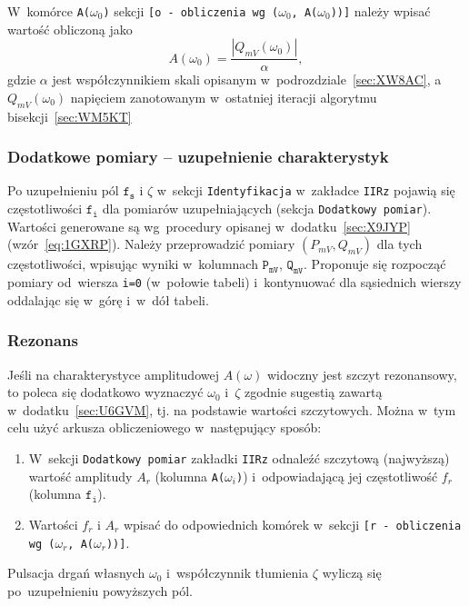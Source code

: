 \documentclass[paper=a4,DIV=12]{lpas}
\begin{document}
W~komórce \texttt{A($\omega_0$)} sekcji \texttt{[o - obliczenia wg ($\omega_0$,
A($\omega_0$))]} należy wpisać wartość obliczoną jako
\begin{equation}
  A(\omega_0) = \frac{|Q_{mV}(\omega_0)|}{\alpha},
  \label{eq:A7ZD6}
\end{equation}
gdzie $\alpha$ jest współczynnikiem skali opisanym
w~podrozdziale~\ref{sec:XW8AC}, a~$Q_{mV}(\omega_0)$ napięciem zanotowanym
w~ostatniej iteracji algorytmu bisekcji~\ref{sec:WM5KT}


\subsubsection{Dodatkowe pomiary -- uzupełnienie charakterystyk}
\label{sec:09H54}

Po uzupełnieniu pól $\texttt{f}_\texttt{s}$ i $\zeta$ w~sekcji
\texttt{Identyfikacja} w~zakładce \texttt{IIRz} pojawią się częstotliwości
$\texttt{f}_\texttt{i}$ dla pomiarów uzupełniających (sekcja \texttt{Dodatkowy
pomiar}). Wartości generowane są wg~procedury opisanej w~dodatku~\ref{sec:X9JYP}
(wzór~\eqref{eq:1GXRP}). Należy przeprowadzić pomiary $(P_{mV}, Q_{mV})$ dla
tych częstotliwości, wpisując wyniki w~kolumnach $\texttt{P}_\texttt{mV}$,
$\texttt{Q}_\texttt{mV}$. Proponuje się rozpocząć pomiary od~wiersza
\texttt{i=0} (w~połowie tabeli) i~kontynuować dla sąsiednich wierszy oddalając
się w~górę i~w~dół tabeli.

\subsubsection{Rezonans}
\label{sec:0NZQS}

Jeśli na charakterystyce amplitudowej $A(\omega)$ widoczny jest szczyt
rezonansowy, to poleca się dodatkowo wyznaczyć $\omega_0$ i~$\zeta$ zgodnie
sugestią zawartą w~dodatku~\ref{sec:U6GVM}, tj. na podstawie wartości
szczytowych. Można w~tym celu użyć arkusza obliczeniowego w~następujący sposób:

\begin{enumerate}
  \item W~sekcji \texttt{Dodatkowy pomiar} zakładki \texttt{IIRz} odnaleźć
    szczytową (najwyższą) wartość amplitudy $A_r$ (kolumna \texttt{A($\omega_i$)})
    i~odpowiadającą jej częstotliwość $f_r$ (kolumna $\texttt{f}_{\texttt{i}}$).
  \item Wartości $f_r$ i $A_r$ wpisać do odpowiednich komórek w~sekcji
    \texttt{[r - obliczenia wg ($\omega_r$, A($\omega_r$))]}.
\end{enumerate}
Pulsacja drgań własnych $\omega_0$ i~współczynnik tłumienia $\zeta$ wyliczą się
po~uzupełnieniu powyższych pól.
\end{document}
